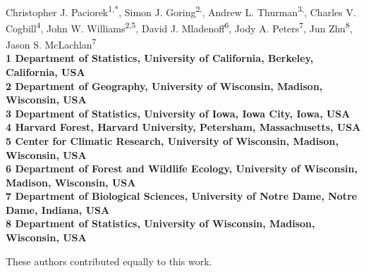 \documentclass[10pt,letterpaper]{article}
\date{}
\begin{document}
\vspace*{0.35in}

\begin{flushleft}
{\Large
\textbf{}
}
\newline
\\
Christopher J. Paciorek\textsuperscript{1,*},
Simon J. Goring\textsuperscript{2,\Yinyang},
Andrew L. Thurman\textsuperscript{3,\Yinyang},
Charles V. Cogbill\textsuperscript{4},
John W. Williams\textsuperscript{2,5},
David J. Mladenoff\textsuperscript{6},
Jody A. Peters\textsuperscript{7},
Jun Zhu\textsuperscript{8},
Jason S. McLachlan\textsuperscript{7}
\\
\bigskip
\bf{1} Department of Statistics, University of California, Berkeley, California,
USA
\\
\bf{2} Department of Geography, University of Wisconsin, Madison, Wisconsin,
USA
\\
\bf{3} Department of Statistics, University of Iowa, Iowa City, Iowa, USA
\\
\bf{4} Harvard Forest, Harvard University, Petersham, Massachusetts, USA
\\
\bf{5} Center for Climatic Research, University of Wisconsin, Madison,
Wisconsin, USA
\\
\bf{6} Department of Forest and Wildlife Ecology, University of Wisconsin,
Madison, Wisconsin, USA
\\
\bf{7} Department of Biological Sciences, University of Notre Dame, Notre
Dame, Indiana, USA
\\
\bf{8} Department of Statistics, University of Wisconsin, Madison, Wisconsin,
USA
\\
\bigskip

% 
%
\Yinyang These authors contributed equally to this work.




\end{flushleft}
\end{document}
